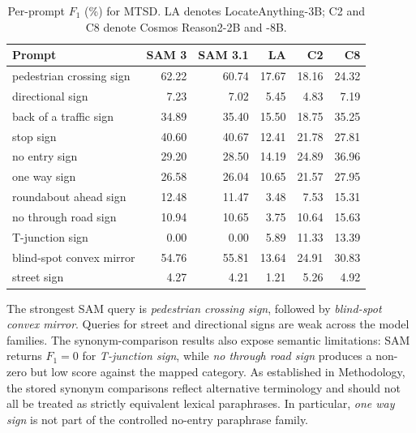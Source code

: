 \begin{table}[htbp]
\centering
\small
\caption{Per-prompt $F_1$ (\%) for \gls{MTSD}. LA denotes LocateAnything-3B; C2 and C8 denote Cosmos Reason2-2B and -8B.}
\label{tab:ev-mtsd-prompt-detail}
\renewcommand{\arraystretch}{1.15}
\begin{tabularx}{\textwidth}{@{}>{\raggedright\arraybackslash}Xrrrrr@{}}
\toprule
Prompt & SAM 3 & SAM 3.1 & LA & C2 & C8 \\
\midrule
pedestrian crossing sign & 62.22 & 60.74 & 17.67 & 18.16 & 24.32 \\
directional sign & 7.23 & 7.02 & 5.45 & 4.83 & 7.19 \\
back of a traffic sign & 34.89 & 35.40 & 15.50 & 18.75 & 35.25 \\
stop sign & 40.60 & 40.67 & 12.41 & 21.78 & 27.81 \\
no entry sign & 29.20 & 28.50 & 14.19 & 24.89 & 36.96 \\
one way sign & 26.58 & 26.04 & 10.65 & 21.57 & 27.95 \\
roundabout ahead sign & 12.48 & 11.47 & 3.48 & 7.53 & 15.31 \\
no through road sign & 10.94 & 10.65 & 3.75 & 10.64 & 15.63 \\
T-junction sign & 0.00 & 0.00 & 5.89 & 11.33 & 13.39 \\
blind-spot convex mirror & 54.76 & 55.81 & 13.64 & 24.91 & 30.83 \\
street sign & 4.27 & 4.21 & 1.21 & 5.26 & 4.92 \\
\bottomrule
\end{tabularx}
\end{table}


The strongest SAM query is \emph{pedestrian crossing sign}, followed by \emph{blind-spot convex mirror}. Queries for street and directional signs are weak across the model families. The synonym-comparison results also expose semantic limitations: SAM returns \(F_1=0\) for \emph{T-junction sign}, while \emph{no through road sign} produces a non-zero but low score against the mapped category. As established in Methodology, the stored synonym comparisons reflect alternative terminology and should not all be treated as strictly equivalent lexical paraphrases. In particular, \emph{one way sign} is not part of the controlled no-entry paraphrase family.

